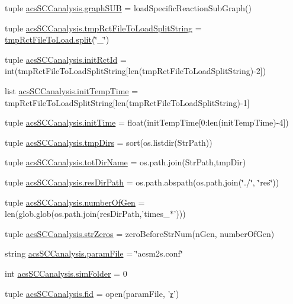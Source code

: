 \begin{DoxyCompactItemize}
\item 
tuple \hyperlink{a00128_ae307841da4a073fad4f6eaa172b0b970}{acs\-S\-C\-Canalysis.\-graph\-S\-U\-B} = load\-Specific\-Reaction\-Sub\-Graph()
\item 
tuple \hyperlink{a00128_add910e17b3f1fe61cdbaf8ce60ec0e20}{acs\-S\-C\-Canalysis.\-tmp\-Rct\-File\-To\-Load\-Split\-String} = \hyperlink{a00059_a4d1aa74fac80ae0275c056575fdb6626}{tmp\-Rct\-File\-To\-Load.\-split}(\char`\"{}\-\_\-\char`\"{})
\item 
tuple \hyperlink{a00128_a212643643fc6b002e8797f16633bb16d}{acs\-S\-C\-Canalysis.\-init\-Rct\-Id} = int(tmp\-Rct\-File\-To\-Load\-Split\-String\mbox{[}len(tmp\-Rct\-File\-To\-Load\-Split\-String)-\/2\mbox{]})
\item 
list \hyperlink{a00128_adc4403c4cfe080918c8b9da692c50509}{acs\-S\-C\-Canalysis.\-init\-Temp\-Time} = tmp\-Rct\-File\-To\-Load\-Split\-String\mbox{[}len(tmp\-Rct\-File\-To\-Load\-Split\-String)-\/1\mbox{]}
\item 
tuple \hyperlink{a00128_a826c1b0585b4e8474c76f92bd7583836}{acs\-S\-C\-Canalysis.\-init\-Time} = float(init\-Temp\-Time\mbox{[}0\-:len(init\-Temp\-Time)-\/4\mbox{]})
\item 
tuple \hyperlink{a00128_ace4c571efd2e5ecd266ce5701f761a83}{acs\-S\-C\-Canalysis.\-tmp\-Dirs} = sort(os.\-listdir(Str\-Path))
\item 
tuple \hyperlink{a00128_a5903034df3d32525785e697152efbeb3}{acs\-S\-C\-Canalysis.\-tot\-Dir\-Name} = os.\-path.\-join(Str\-Path,tmp\-Dir)
\item 
tuple \hyperlink{a00128_a9ededb3cd7c63befde39ad68e5f9e006}{acs\-S\-C\-Canalysis.\-res\-Dir\-Path} = os.\-path.\-abspath(os.\-path.\-join(\char`\"{}./\char`\"{}, \char`\"{}res\char`\"{}))
\item 
tuple \hyperlink{a00128_a9a81829f850e2e125e3c94214da7a1f0}{acs\-S\-C\-Canalysis.\-number\-Of\-Gen} = len(glob.\-glob(os.\-path.\-join(res\-Dir\-Path,'times\-\_\-$\ast$')))
\item 
tuple \hyperlink{a00128_a8ba6aefb71b3d1e575eac38627f143d6}{acs\-S\-C\-Canalysis.\-str\-Zeros} = zero\-Before\-Str\-Num(n\-Gen, number\-Of\-Gen)
\item 
string \hyperlink{a00128_a7160f8e48b4aafebbd75e9037fc9fef7}{acs\-S\-C\-Canalysis.\-param\-File} = \char`\"{}acsm2s.\-conf\char`\"{}
\item 
int \hyperlink{a00128_a58095f64afeda893517e81226e1963c3}{acs\-S\-C\-Canalysis.\-sim\-Folder} = 0
\item 
tuple \hyperlink{a00128_a424e2204e89264a827e6cad861ebcbc1}{acs\-S\-C\-Canalysis.\-fid} = open(param\-File, '\hyperlink{a00031_ac862e7284527eb913b1351c8bfb8e079}{r}')

\end{DoxyCompactItemize}
